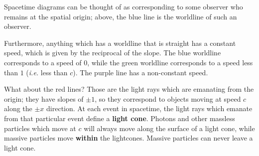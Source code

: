 \documentclass[11pt]{article}
\begin{document}
Spacetime diagrams can be thought of as corresponding to some observer who remains at the spatial origin; above, the blue line is the worldline of such an observer.

Furthermore, anything which has a worldline that is straight has a constant speed, which is given by the reciprocal of the slope. The blue worldline corresponds to a speed of $0$, while the green worldline corresponds to a speed less than $1$ (\textit{i.e.} less than $c$). The purple line has a non-constant speed.

What about the red lines? Those are the light rays which are emanating from the origin; they have slopes of $\pm 1$, so they correspond to objects moving at speed $c$ along the $\pm x$ direction. At each event in spacetime, the light rays which emanate from that particular event define a \textbf{light cone}. Photons and other massless particles which move at $c$ will always move along the surface of a light cone, while massive particles move \textbf{within} the lightcones. Massive particles can never leave a light cone.

\begin{figure}[H]    
\centering
{}
\caption{}
\end{figure}    
 
\end{document}
